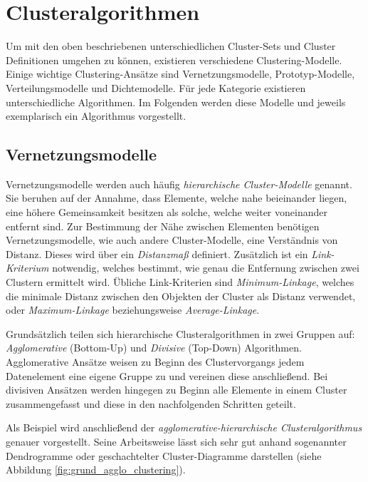 \section{Clusteralgorithmen}
\label{sec:cluster_algos}

Um mit den oben beschriebenen unterschiedlichen Cluster-Sets und Cluster Definitionen umgehen zu können,
existieren verschiedene Clustering-Modelle.
Einige wichtige Clustering-Ansätze sind Vernetzungsmodelle, Prototyp-Modelle, Verteilungsmodelle
und Dichtemodelle. Für jede Kategorie existieren unterschiedliche Algorithmen. Im Folgenden werden
diese Modelle und jeweils exemplarisch ein Algorithmus vorgestellt.

\subsection{Vernetzungsmodelle}
\label{sec:grund_vernetzungs_clustering}

Vernetzungsmodelle werden auch häufig \textit{hierarchische Cluster-Modelle} genannt. Sie beruhen auf
der Annahme, dass Elemente, welche nahe beieinander liegen, eine höhere Gemeinsamkeit besitzen als solche,
welche weiter voneinander entfernt sind. Zur Bestimmung der Nähe zwischen Elementen benötigen Vernetzungsmodelle,
wie auch andere Cluster-Modelle, eine Verständnis von Distanz. Dieses wird über ein \textit{Distanzmaß} definiert.
Zusätzlich ist ein \textit{Link-Kriterium} notwendig,
welches bestimmt, wie genau die Entfernung zwischen zwei Clustern ermittelt wird. Übliche Link-Kriterien
sind \textit{Minimum-Linkage}, welches die minimale Distanz zwischen den Objekten der Cluster als Distanz verwendet,
oder \textit{Maximum-Linkage} beziehungsweise \textit{Average-Linkage}. \cite[]{Jain1999, GeorgeSeif2018}

Grundsätzlich teilen sich hierarchische Clusteralgorithmen in zwei Gruppen auf:
\textit{Agglomerative} (Bottom-Up) und \textit{Divisive} (Top-Down) Algorithmen.
Agglomerative Ansätze weisen zu Beginn des Clustervorgangs jedem Datenelement eine eigene Gruppe zu
und vereinen diese anschließend.
Bei divisiven Ansätzen werden hingegen zu Beginn alle Elemente in einem Cluster zusammengefasst und
diese in den nachfolgenden Schritten geteilt.

Als Beispiel wird anschließend der \textit{agglomerative-hierarchische Clusteralgorithmus} genauer vorgestellt.
Seine Arbeitsweise lässt sich sehr gut anhand sogenannter Dendrogramme oder geschachtelter Cluster-Diagramme darstellen
(siehe Abbildung \ref{fig:grund_agglo_clustering}).

